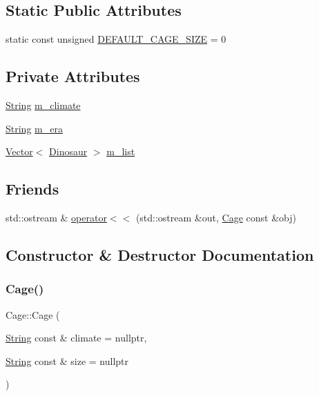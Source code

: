 \subsection*{Static Public Attributes}
\begin{DoxyCompactItemize}
\item 
static const unsigned \hyperlink{classCage_a3d4801616b5e775d58a89f0f06c839e8}{D\+E\+F\+A\+U\+L\+T\+\_\+\+C\+A\+G\+E\+\_\+\+S\+I\+ZE} = 0
\end{DoxyCompactItemize}
\subsection*{Private Attributes}
\begin{DoxyCompactItemize}
\item 
\hyperlink{classString}{String} \hyperlink{classCage_a4c493c1794fadd15d5e972bd9094e7b6}{m\+\_\+climate}
\item 
\hyperlink{classString}{String} \hyperlink{classCage_af378135c2ac9806108d09890f2c076ae}{m\+\_\+era}
\item 
\hyperlink{classVector}{Vector}$<$ \hyperlink{classDinosaur}{Dinosaur} $>$ \hyperlink{classCage_a7c2cb11aa36b13c8bc4288266ac74301}{m\+\_\+list}
\end{DoxyCompactItemize}
\subsection*{Friends}
\begin{DoxyCompactItemize}
\item 
std\+::ostream \& \hyperlink{classCage_a9ee62677a8398c9bd4021b3dc8644a72}{operator$<$$<$} (std\+::ostream \&out, \hyperlink{classCage}{Cage} const \&obj)
\end{DoxyCompactItemize}


\subsection{Constructor \& Destructor Documentation}
\mbox{\label{classCage_afbe886c9ec6a09ad2d8a00d46678f9af}} 
\subsubsection{\texorpdfstring{Cage()}{Cage()}}
{\footnotesize\ttfamily Cage\+::\+Cage (\begin{DoxyParamCaption}\item[{\hyperlink{classString}{String} const \&}]{climate = {\ttfamily nullptr},  }\item[{\hyperlink{classString}{String} const \&}]{size = {\ttfamily nullptr} }\end{DoxyParamCaption})}



